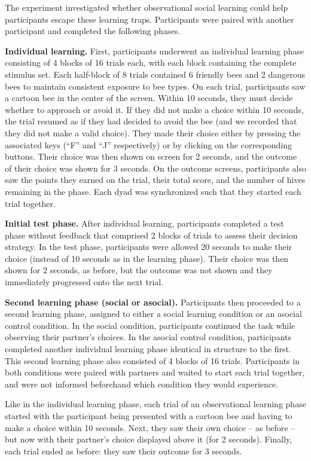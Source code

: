 \documentclass[11pt]{article} %
\begin{document}
The experiment investigated whether observational social learning could help participants escape these learning traps. Participants were paired with another participant and completed the following phases.



\textbf{Individual learning.} First, participants underwent an individual learning phase consisting of 4 blocks of 16 trials each, with each block containing the complete stimulus set. Each half-block of 8 trials contained 6 friendly bees and 2 dangerous bees to maintain consistent exposure to bee types. On each trial, participants saw a cartoon bee in the center of the screen. Within 10 seconds, they must decide whether to approach or avoid it. If they did not make a choice within 10 seconds, the trial resumed as if they had decided to avoid the bee (and we recorded that they did not make a valid choice). They made their choice either by pressing the associated keys (``F'' and ``J'' respectively) or by clicking on the corresponding buttons. Their choice was then shown on screen for 2 seconds, and the outcome of their choice was shown for 3 seconds. On the outcome screens, participants also saw the points they earned on the trial, their total score, and the number of hives remaining in the phase. Each dyad was synchronized such that they started each trial together.

\textbf{Initial test phase.} After individual learning, participants completed a test phase without feedback that comprised 2 blocks of trials to assess their decision strategy. In the test phase, participants were allowed 20 seconds to make their choice (instead of 10 seconds as in the learning phase). Their choice was then shown for 2 seconds, as before, but the outcome was not shown and they immediately progressed onto the next trial. 

\textbf{Second learning phase (social or asocial).} Participants then proceeded to a second learning phase, assigned to either a social learning condition or an asocial control condition. In the social condition, participants continued the task while observing their partner's choices. In the asocial control condition, participants completed another individual learning phase identical in structure to the first. This second learning phase also consisted of 4 blocks of 16 trials. Participants in both conditions were paired with partners and waited to start each trial together, and were not informed beforehand which condition they would experience.

Like in the individual learning phase, each trial of an observational learning phase started with the participant being presented with a cartoon bee and having to make a choice within 10 seconds. Next, they saw their own choice -- as before -- but now with their partner's choice displayed above it (for 2 seconds). Finally, each trial ended as before: they saw their outcome for 3 seconds. 
\end{document}
